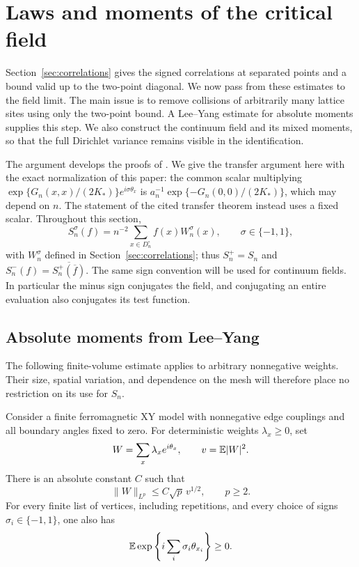 \section{Laws and moments of the critical field}\label{sec:fields}

Section~\ref{sec:correlations} gives the signed correlations at separated
points and a bound valid up to the two-point diagonal.  We now pass from
these estimates to the field limit.  The main issue is to remove
collisions of arbitrarily many lattice sites using only the two-point
bound.  A Lee--Yang estimate for absolute moments supplies this step.
We also construct the continuum field and its mixed moments, so that
the full Dirichlet variance remains visible in the identification.

The argument develops the proofs of \cite[Lemmas~5.10--5.11 and
Theorem~5.12]{B}.  We give the transfer argument here with the exact
normalization of this paper: the common scalar multiplying
$\exp\{G_n(x,x)/(2K_*)\}e^{i\sigma\theta_x}$ is
$a_n^{-1}\exp\{-G_n(0,0)/(2K_*)\}$, which may depend on $n$.
The statement of the cited transfer theorem instead uses a fixed
scalar.  Throughout this section,
\[
 S_n^\sigma(f)=n^{-2}\sum_{x\in D_n^\circ}f(x)W_n^\sigma(x),
 \qquad \sigma\in\{-1,1\},
\]
with $W_n^\sigma$ defined in Section~\ref{sec:correlations}; thus
$S_n^+=S_n$ and
$S_n^-(f)=\overline{S_n^+(\overline f)}$.
The same sign convention will be used for continuum fields.  In
particular the minus sign conjugates the field, and conjugating an
entire evaluation also conjugates its test function.

\subsection{Absolute moments from Lee--Yang}

The following finite-volume estimate applies to arbitrary nonnegative
weights.  Their size, spatial variation, and dependence on the mesh
will therefore place no restriction on its use for $S_n$.

\begin{lemma}\label{fields:lee-yang}
Consider a finite ferromagnetic XY model with nonnegative edge
couplings and all boundary angles fixed to zero.  For deterministic
weights $\lambda_x\geq0$, set
\[
 W=\sum_x\lambda_x e^{i\theta_x},\qquad v=\mathbb E|W|^2.
\]
There is an absolute constant $C$ such that
\begin{equation}\label{fields:ly-bound}
 \|W\|_{L^p}\leq C\sqrt p\,v^{1/2},\qquad p\geq2.
\end{equation}
For every finite list of vertices, including repetitions, and every
choice of signs $\sigma_i\in\{-1,1\}$, one also has
\begin{equation}\label{fields:positive-moments}
 \mathbb E\exp\left\{i\sum_i\sigma_i\theta_{x_i}\right\}\geq0.
\end{equation}
\end{lemma}

